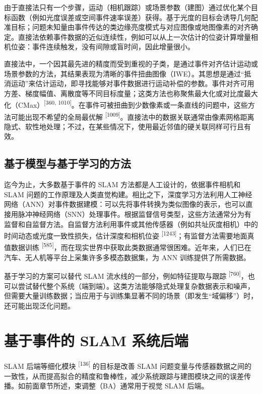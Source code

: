 由于直接法只有一个步骤，运动（相机跟踪）或场景参数（建图）通过优化某个目标函数（例如光度误差或空间事件速率误差）获得。基于光度的目标会诱导几何配准目标；问题未知量由事件传达的类边缘亮度模式与对应图像或地图像素的对齐确定。直接法依赖事件数据的近似连续性，例如可以从上一次估计的位姿计算增量相机位姿：事件连续触发，没有间隙或盲时间，因此增量很小。

直接法中，一个因其最先进的精度而受到重视的子类，是通过事件对齐估计运动或场景参数的方法，其结果表现为清晰的事件扭曲图像（IWE）。其思想是通过“抵消运动”来估计运动，即寻找能够对事件数据进行运动补偿的参数。事件对齐可用方差、梯度幅值、离散度等不同目标度量；这类方法也称聚焦最大化或对比度最大化（CMax）\textsuperscript{[360, 1010]}。在事件可被扭曲到少数像素或一条直线的问题中，这些方法可能出现不希望的全局最优解 \textsuperscript{[1009]}。直接法中的数据关联通常由像素网格距离隐式、软性地处理；不过，在某些情况下，使用最近邻值的硬关联同样可行且有效。

\subsection{基于模型与基于学习的方法}

迄今为止，大多数基于事件的 SLAM 方法都是人工设计的，依据事件相机和 SLAM 问题的工作原理及人类直觉构建。相比之下，深度学习方法利用人工神经网络（ANN）对事件数据建模：可以先将事件转换为类似图像的表示，也可以直接用脉冲神经网络（SNN）处理事件。根据监督信号类型，这些方法通常分为有监督和自监督方法。自监督方法利用事件或其他传感器（例如共址灰度相机）中的时间动态或光度一致性损失，估计深度和相机位姿 \textsuperscript{[1243]}；有监督方法需要地面真值数据训练 \textsuperscript{[585]}，而在现实世界中获取此类数据通常很困难。近年来，人们已在汽车、无人机等平台上采集许多多模态数据集，为 ANN 训练提供了所需数据。

基于学习的方案可以替代 SLAM 流水线的一部分，例如特征提取与跟踪 \textsuperscript{[760]}，也可以尝试替代整个系统（端到端）。这类方法能够隐式处理复杂数据表示和噪声，但需要大量训练数据；当应用于与训练集显著不同的场景（即发生“域偏移”）时，还可能出现泛化问题。

\section{基于事件的 SLAM 系统后端}

SLAM 后端等细化模块 \textsuperscript{[136]} 的目标是改善 SLAM 问题变量与传感器数据之间的一致性，从而提高拟合的精度和鲁棒性，减少系统跟踪与建图模块之间的误差传播。如前面章节所述，束调整（BA）通常用于视觉 SLAM 后端。

